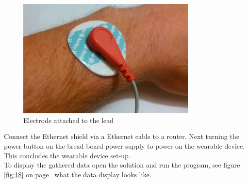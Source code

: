 \documentclass[12pt,]{article}
\numberwithin{figure}{section}
\begin{document}
\begin{figure}[H]
	\begin{center}
		\includegraphics[width=0.8\textwidth]{25}
	\end{center}
    \caption{Electrode attached to the lead}
	\label{fig:38}
\end{figure}
Connect the Ethernet shield via a Ethernet cable to a router. Next turning the power button on the bread board power supply to power on the wearable device. This concludes the wearable device set-up.\\
To display the gathered data open the solution and run the program, see figure \ref{fig:18} on page~\pageref{fig:18} what the data display looks like.
\newpage
\end{document}
